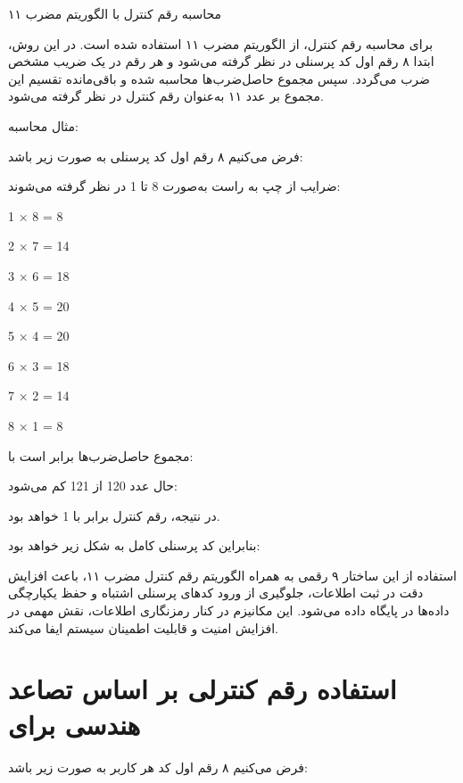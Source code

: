 \documentclass[12pt,a4paper]{report}
\begin{document}
محاسبه رقم کنترل با الگوریتم مضرب ۱۱

برای محاسبه رقم کنترل، از الگوریتم مضرب ۱۱ استفاده شده است. در این روش، ابتدا ۸ رقم اول کد پرسنلی در نظر گرفته می‌شود و هر رقم در یک ضریب مشخص ضرب می‌گردد. سپس مجموع حاصل‌ضرب‌ها محاسبه شده و باقی‌مانده تقسیم این مجموع بر عدد ۱۱ به‌عنوان رقم کنترل در نظر گرفته می‌شود.

مثال محاسبه:

فرض می‌کنیم ۸ رقم اول کد پرسنلی به صورت زیر باشد:

\begin{center}
\end{center}

ضرایب از چپ به راست به‌صورت 8 تا 1 در نظر گرفته می‌شوند:
\begin{center}
	\begin{latin}
		1 × 8 = 8
		
		2 × 7 = 14
		
		3 × 6 = 18
		
		4 × 5 = 20
		
		5 × 4 = 20
		
		6 × 3 = 18
		
		7 × 2 = 14
		
		8 × 1 = 8
		
	\end{latin}
\end{center}
مجموع حاصل‌ضرب‌ها برابر است با:
\begin{center}
\end{center}


حال عدد 120 از  121  کم می‌شود:
\begin{center}
\end{center}

در نتیجه، رقم کنترل برابر با 1 خواهد بود.

بنابراین کد پرسنلی کامل به شکل زیر خواهد بود:

\begin{center}
\end{center}

استفاده از این ساختار ۹ رقمی به همراه الگوریتم رقم کنترل مضرب ۱۱، باعث افزایش دقت در ثبت اطلاعات، جلوگیری از ورود کدهای پرسنلی اشتباه و حفظ یکپارچگی داده‌ها در پایگاه داده می‌شود. این مکانیزم در کنار رمزنگاری اطلاعات، نقش مهمی در افزایش امنیت و قابلیت اطمینان سیستم ایفا می‌کند.
\newpage
\section{استفاده  رقم کنترلی  بر اساس تصاعد هندسی برای }
فرض می‌کنیم ۸ رقم اول کد هر کاربر  به صورت زیر باشد:
\end{document}
